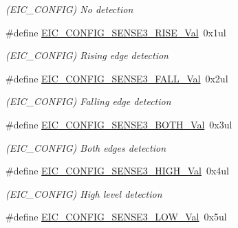 \begin{DoxyCompactItemize}
\begin{DoxyCompactList}\small\item\em (E\+I\+C\+\_\+\+C\+O\+N\+F\+I\+G) No detection \end{DoxyCompactList}\item 
\hypertarget{group___s_a_m_l21___e_i_c_gae1f57c9ebb1706bb46bc77ef24f56a81}{}\#define \hyperlink{group___s_a_m_l21___e_i_c_gae1f57c9ebb1706bb46bc77ef24f56a81}{E\+I\+C\+\_\+\+C\+O\+N\+F\+I\+G\+\_\+\+S\+E\+N\+S\+E3\+\_\+\+R\+I\+S\+E\+\_\+\+Val}~0x1ul\label{group___s_a_m_l21___e_i_c_gae1f57c9ebb1706bb46bc77ef24f56a81}

\begin{DoxyCompactList}\small\item\em (E\+I\+C\+\_\+\+C\+O\+N\+F\+I\+G) Rising edge detection \end{DoxyCompactList}\item 
\hypertarget{group___s_a_m_l21___e_i_c_gaf4c91968458631be4fa57f3c0c15404c}{}\#define \hyperlink{group___s_a_m_l21___e_i_c_gaf4c91968458631be4fa57f3c0c15404c}{E\+I\+C\+\_\+\+C\+O\+N\+F\+I\+G\+\_\+\+S\+E\+N\+S\+E3\+\_\+\+F\+A\+L\+L\+\_\+\+Val}~0x2ul\label{group___s_a_m_l21___e_i_c_gaf4c91968458631be4fa57f3c0c15404c}

\begin{DoxyCompactList}\small\item\em (E\+I\+C\+\_\+\+C\+O\+N\+F\+I\+G) Falling edge detection \end{DoxyCompactList}\item 
\hypertarget{group___s_a_m_l21___e_i_c_gaa8713c71e12ac27aed9182636e488bc6}{}\#define \hyperlink{group___s_a_m_l21___e_i_c_gaa8713c71e12ac27aed9182636e488bc6}{E\+I\+C\+\_\+\+C\+O\+N\+F\+I\+G\+\_\+\+S\+E\+N\+S\+E3\+\_\+\+B\+O\+T\+H\+\_\+\+Val}~0x3ul\label{group___s_a_m_l21___e_i_c_gaa8713c71e12ac27aed9182636e488bc6}

\begin{DoxyCompactList}\small\item\em (E\+I\+C\+\_\+\+C\+O\+N\+F\+I\+G) Both edges detection \end{DoxyCompactList}\item 
\hypertarget{group___s_a_m_l21___e_i_c_gac73c1ef1256ac37c4a05f3f3437ca87d}{}\#define \hyperlink{group___s_a_m_l21___e_i_c_gac73c1ef1256ac37c4a05f3f3437ca87d}{E\+I\+C\+\_\+\+C\+O\+N\+F\+I\+G\+\_\+\+S\+E\+N\+S\+E3\+\_\+\+H\+I\+G\+H\+\_\+\+Val}~0x4ul\label{group___s_a_m_l21___e_i_c_gac73c1ef1256ac37c4a05f3f3437ca87d}

\begin{DoxyCompactList}\small\item\em (E\+I\+C\+\_\+\+C\+O\+N\+F\+I\+G) High level detection \end{DoxyCompactList}\item 
\hypertarget{group___s_a_m_l21___e_i_c_gacd770ca16cc8b9bd76408b1ab7391ff5}{}\#define \hyperlink{group___s_a_m_l21___e_i_c_gacd770ca16cc8b9bd76408b1ab7391ff5}{E\+I\+C\+\_\+\+C\+O\+N\+F\+I\+G\+\_\+\+S\+E\+N\+S\+E3\+\_\+\+L\+O\+W\+\_\+\+Val}~0x5ul\label{group___s_a_m_l21___e_i_c_gacd770ca16cc8b9bd76408b1ab7391ff5}


\end{DoxyCompactItemize}
